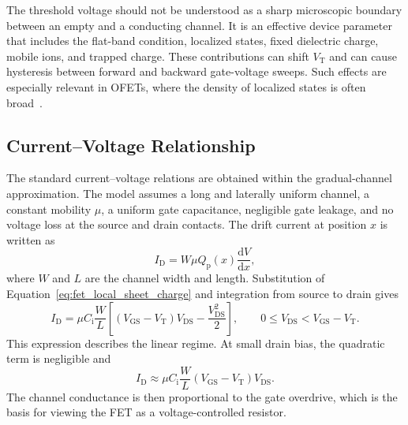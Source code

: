 The threshold voltage should not be understood as a sharp microscopic boundary
between an empty and a conducting channel. It is an effective device parameter
that includes the flat-band condition, localized states, fixed dielectric charge,
mobile ions, and trapped charge. These contributions can shift
$V_\mathrm{T}$ and can cause hysteresis between forward and backward gate-voltage
sweeps. Such effects are especially relevant in OFETs, where the density of
localized states is often broad~\cite{Bruetting2005,Sirringhaus2005DevicePhysics}.

\subsection{Current--Voltage Relationship}

The standard current--voltage relations are obtained within the gradual-channel
approximation. The model assumes a long and laterally uniform channel, a constant
mobility $\mu$, a uniform gate capacitance, negligible gate leakage, and no
voltage loss at the source and drain contacts. The drift current at position $x$
is written as
\begin{equation}
    I_\mathrm{D}
    = W\mu Q_\mathrm{p}(x)\frac{\mathrm{d}V}{\mathrm{d}x},
    \label{eq:fet_local_current}
\end{equation}
where $W$ and $L$ are the channel width and length. Substitution of
Equation~\ref{eq:fet_local_sheet_charge} and integration from source to drain
gives
\begin{equation}
    I_\mathrm{D}
    = \mu C_\mathrm{i}\frac{W}{L}
    \left[
        \left(V_\mathrm{GS}-V_\mathrm{T}\right)V_\mathrm{DS}
        -\frac{V_\mathrm{DS}^{2}}{2}
    \right],
    \qquad
    0\leq V_\mathrm{DS}<V_\mathrm{GS} - V_\mathrm{T}.
    \label{eq:fet_linear_current}
\end{equation}
This expression describes the linear regime. At small drain bias, the quadratic
term is negligible and
\begin{equation}
    I_\mathrm{D}
    \approx \mu C_\mathrm{i}\frac{W}{L}
    \left(V_\mathrm{GS}-V_\mathrm{T}\right)V_\mathrm{DS}.
    \label{eq:fet_low_vds_current}
\end{equation}
The channel conductance is then proportional to the gate overdrive, which is the
basis for viewing the FET as a voltage-controlled resistor.

